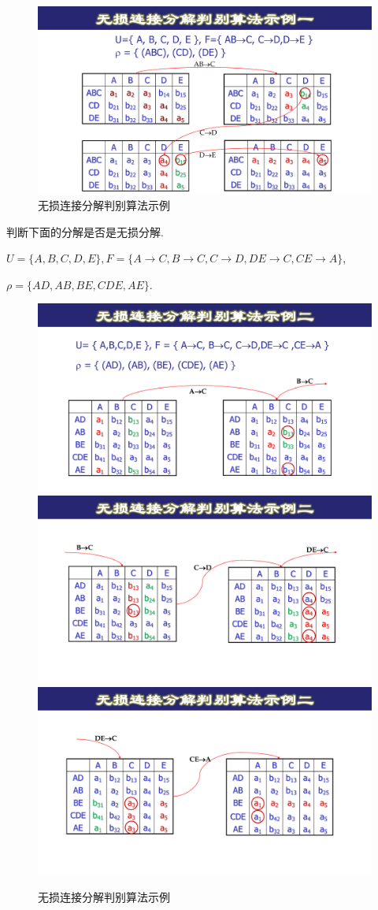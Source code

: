 \begin{figure}[H]
    \centering
    \includegraphics[width=.5\textwidth]{./figure/无损分解判定.pdf}
    \caption{无损连接分解判别算法示例}
\end{figure}

\begin{example}
  判断下面的分解是否是无损分解.
  
  $U=\{ A, B, C, D, E \},F = \{ A \rightarrow C, B \rightarrow C, C \rightarrow D, DE \rightarrow C, CE \rightarrow A \}$,  
  
  $\rho = \{ AD, AB, BE, CDE,AE\}$.
\end{example}

\begin{figure}[H]
    \centering
    \includegraphics[width=.45\textwidth]{./figure/1.pdf}
    \includegraphics[width=.45\textwidth]{./figure/2.pdf}
    \includegraphics[width=.5\textwidth]{./figure/3.pdf}
    \caption{无损连接分解判别算法示例}
\end{figure}

